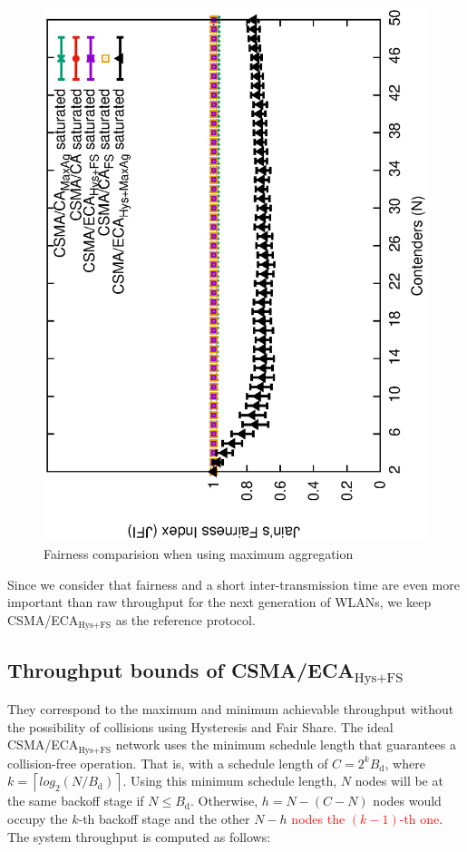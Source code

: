 	\begin{figure}[tb]
	\centering
		\includegraphics[width=0.7\linewidth,angle=-90]{figures/fairness-max-Ag/fairness-maxAg-combined-TON.eps}
		\caption{Fairness comparision when using maximum aggregation}
		\label{fig:fairness-with-maximum-aggregation}
	\end{figure}
	
	Since we consider that fairness and a short inter-transmission time are even more important than raw throughput for the next generation of WLANs, we keep CSMA/ECA$_{\text{Hys+FS}}$ as the reference protocol.
	
	\subsection{Throughput bounds of CSMA/ECA$_{\text{Hys+FS}}$}\label{ECA-bounds}
	
	They correspond to the maximum and minimum achievable throughput without the possibility of collisions using Hysteresis and Fair Share. The ideal CSMA/ECA$_{\text{Hys+FS}}$ network uses the minimum schedule length that guarantees a collision-free operation. That is, with a schedule length of $C=2^{k}B_{\text{d}}$, where $k = \left\lceil log_{2}(N/B_{\text{d}})\right\rceil$. Using this minimum schedule length, $N$ nodes will be at the same backoff stage if $N\leq B_{\text{d}}$. Otherwise, $h = N-(C-N)$ nodes would occupy the $k$-th backoff stage and the other $N-h$ \textcolor{red}{nodes the $(k-1)$-th one}. The system throughput is computed as follows:
	

